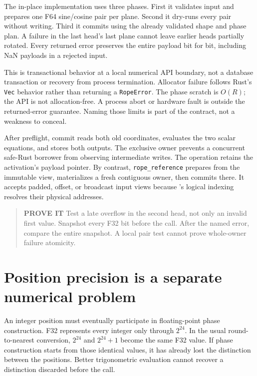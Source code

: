 The in-place implementation uses three phases. First it validates input
and prepares one F64 sine/cosine pair per plane. Second it dry-runs
every pair without writing. Third it commits using the already validated
shape and phase plan. A failure in the last head's last plane cannot
leave earlier heads partially rotated. Every returned error preserves
the entire payload bit for bit, including NaN payloads in a rejected
input.

This is transactional behavior at a local numerical API boundary, not a
database transaction or recovery from process termination. Allocator
failure follows Rust's \texttt{Vec} behavior rather than returning a
\texttt{RopeError}. The phase scratch is \(O(R)\); the API is not
allocation-free. A process abort or hardware fault is outside the
returned-error guarantee. Naming those limits is part of the contract,
not a weakness to conceal.

After preflight, commit reads both old coordinates, evaluates the two
scalar equations, and stores both outputs. The exclusive owner prevents
a concurrent safe-Rust borrower from observing intermediate writes. The
operation retains the activation's payload pointer. By contrast,
\texttt{rope\_reference} prepares from the immutable view, materializes
a fresh contiguous owner, then commits there. It accepts padded, offset,
or broadcast input views because 's logical indexing resolves
their physical addresses.

\begin{quote}
\textbf{PROVE IT} Test a late overflow in the second head, not only an
invalid first value. Snapshot every F32 bit before the call. After the
named error, compare the entire snapshot. A local pair test cannot prove
whole-owner failure atomicity.
\end{quote}

\section{Position precision is a separate numerical
problem}\label{position-precision-is-a-separate-numerical-problem}

An integer position must eventually participate in floating-point phase
construction. F32 represents every integer only through \(2^{24}\). In
the usual round-to-nearest conversion, \(2^{24}\) and \(2^{24}+1\)
become the same F32 value. If phase construction starts from those
identical values, it has already lost the distinction between the
positions. Better trigonometric evaluation cannot recover a distinction
discarded before the call.

